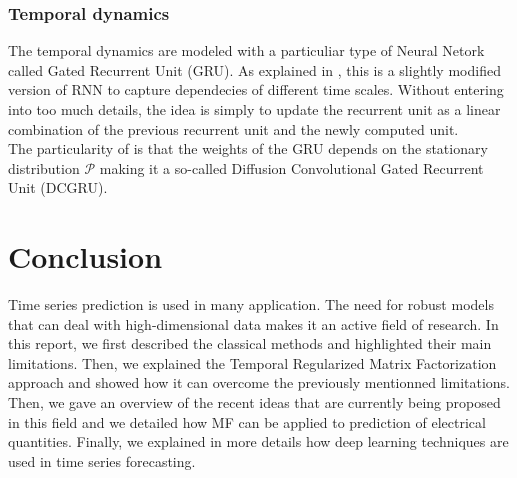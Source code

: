 \documentclass{article}
\begin{document}
\subsubsection*{Temporal dynamics}
The temporal dynamics are modeled with a particuliar type of Neural Netork called Gated Recurrent Unit (GRU). As explained in \cite{ChungGCB14}, this is a slightly modified version of RNN to capture dependecies of different time scales. Without entering into too much details, the idea is simply to update the recurrent unit as a linear combination of the previous recurrent unit and the newly computed unit. \\
The particularity of \cite{Traffic} is that the weights of the GRU depends on the stationary distribution $\mathcal{P}$ making it a so-called Diffusion Convolutional Gated Recurrent Unit (DCGRU).

\section{Conclusion}
\label{conc}
Time series prediction is used in many application. The need for robust models that can deal with high-dimensional data makes it an active field of research. In this report, we first described the classical methods and highlighted their main limitations. Then, we explained the Temporal Regularized Matrix Factorization approach and showed how it can overcome the previously mentionned limitations. Then, we gave an overview of the recent ideas that are currently being proposed in this field and we detailed how MF can be applied to prediction of electrical quantities. Finally, we explained in more details how deep learning techniques are used in time series forecasting.

\newpage



\end{document}
